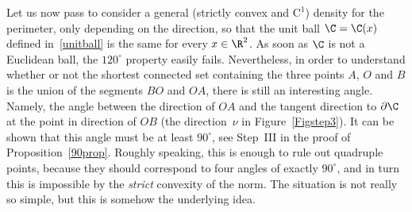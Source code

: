 Let us now pass to consider a general (strictly convex and $\mathrm{C}^1$) density for the perimeter, only depending on the direction, so that the unit ball $\C=\C(x)$ defined in~\eqref{unitball} is the same for every $x\in\R^2$. As soon as $\C$ is not a Euclidean ball, the $120^\circ$ property easily fails. Nevertheless, in order to understand whether or not the shortest connected set containing the three points $A$, $O$ and $B$ is the union of the segments $BO$ and $OA$, there is still an interesting angle. Namely, the angle between the direction of $OA$ and the tangent direction to $\partial\C$ at the point in direction of $OB$ (the direction~$\nu$ in Figure~\ref{Figstep3}). It can be shown that this angle must be at least $90^\circ$, see Step~III in the proof of Proposition~\ref{90prop}. Roughly speaking, this is enough to rule out quadruple points, because they should correspond to four angles of exactly $90^\circ$, and in turn this is impossible by the \emph{strict} convexity of the norm. The situation is not really so simple, but this is somehow the underlying idea.

